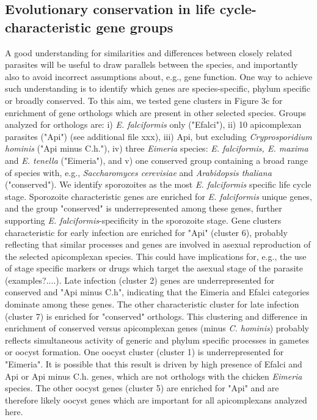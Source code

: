 \documentclass{bmcart}
\begin{document}
\subsection*{Evolutionary conservation in life cycle-characteristic gene groups}
A good understanding for similarities and differences between closely related parasites will be useful to draw parallels between the species, and importantly also to avoid incorrect assumptions about, e.g., gene function. One way to achieve such understanding is to identify which genes are species-specific, phylum specific or broadly conserved. To this aim, we tested gene clusters in Figure 3c for enrichment of gene orthologs which are present in other selected species. Groups analyzed for orthologs are: i) \textit{E. falciformis} only ("Efalci"), ii) 10 apicomplexan parasites ("Api") (see additional file xxx), iii) Api, but excluding \textit{Cryprosporidium hominis} ("Api minus C.h."), iv) three \textit{Eimeria} species: \textit{E. falciformis, E. maxima} and \textit{E. tenella} ("Eimeria"), and v) one conserved group containing a broad range of species with, e.g., \textit{Saccharomyces cerevisiae} and \textit{Arabidopsis thaliana} ("conserved"). 
We identify sporozoites as the most \textit{E. falciformis} specific life cycle stage. Sporozoite characteristic genes are enriched for \textit{E. falciformis} unique genes, and the group "conserved" is underrepresented among these genes, further supporting \textit{E. falciformis}-specificity in the sporozoite stage. Gene clusters characteristic for early infection are enriched for "Api" (cluster 6), probably reflecting that similar processes and genes are involved in asexual reproduction of the selected apicomplexan species. This could have implications for, e.g., the use of stage specific markers or drugs which target the asexual stage of the parasite (examples?....). 
Late infection (cluster 2) genes are underrepresented for conserved and "Api minus C.h", indicating that the Eimeria and Efalci categories dominate among these genes. The other characteristic cluster for late infection (cluster 7) is enriched for "conserved" orthologs. This clustering and difference in enrichment of conserved versus apicomplexan genes (minus \textit{C. hominis}) probably reflects simultaneous activity of generic and phylum specific processes in gametes or oocyst formation. 
One oocyst cluster (cluster 1) is underrepresented for "Eimeria". It is possible that this result is driven by high presence of Efalci and Api or Api minus C.h. genes, which are not orthologs with the chicken \textit{Eimeria} species. The other oocyst genes (cluster 5) are enriched for "Api" and are therefore likely oocyst genes which are important for all apicomplexans analyzed here. 
\end{document}
